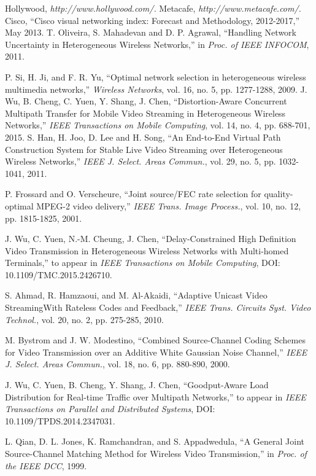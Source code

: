 \documentclass[journal]{IEEEtran}
\begin{document}
\begin{thebibliography}{1}
Hollywood, \emph{http://www.hollywood.com/.}
Metacafe, \emph{http://www.metacafe.com/.}
Cisco, ``Cisco visual networking index: Forecast and Methodology, 2012-2017,''\text{ } May 2013.
T. Oliveira, S. Mahadevan and D. P. Agrawal, ``Handling Network Uncertainty in Heterogeneous Wireless Networks,'' in \emph{Proc. of IEEE INFOCOM}, 2011.

P. Si, H. Ji, and F. R. Yu, ``Optimal network selection in heterogeneous wireless multimedia networks,''\emph{ Wireless Networks}, vol. 16, no. 5, pp. 1277-1288, 2009.
J. Wu, B. Cheng, C. Yuen, Y. Shang, J. Chen, ``Distortion-Aware Concurrent Multipath Transfer for Mobile Video Streaming in Heterogeneous Wireless Networks,'' \emph{IEEE Transactions on Mobile Computing}, vol. 14, no. 4, pp. 688-701, 2015.
S. Han, H. Joo, D. Lee and H. Song, ``An End-to-End Virtual Path Construction System for Stable Live Video Streaming over Heterogeneous Wireless Networks,'' \emph{ IEEE J. Select. Areas Commun.}, vol. 29, no. 5, pp. 1032-1041, 2011.

P. Frossard and O. Verscheure, ``Joint source/FEC rate selection for quality-optimal MPEG-2 video delivery,'' \emph{IEEE Trans. Image Process.}, vol. 10, no. 12, pp. 1815-1825, 2001.

J. Wu, C. Yuen, N.-M. Cheung, J. Chen, ``Delay-Constrained High Definition Video Transmission in Heterogeneous Wireless Networks with Multi-homed Terminals,'' to appear in \emph{IEEE Transactions on Mobile Computing}, DOI: 10.1109/TMC.2015.2426710.

S. Ahmad, R. Hamzaoui, and M. Al-Akaidi, ``Adaptive Unicast Video StreamingWith Rateless Codes and Feedback,'' \emph{IEEE Trans. Circuits Syst. Video Technol.}, vol. 20, no. 2, pp. 275-285, 2010.

M. Bystrom and J. W. Modestino, ``Combined Source-Channel Coding Schemes for Video Transmission over an Additive White Gaussian Noise Channel,'' \emph{IEEE J. Select. Areas Commun.}, vol. 18, no. 6, pp. 880-890, 2000.

J. Wu, C. Yuen, B. Cheng, Y. Shang, J. Chen, ``Goodput-Aware Load Distribution for Real-time Traffic over Multipath Networks,'' to appear in \emph{IEEE Transactions on Parallel and Distributed Systems}, DOI: 10.1109/TPDS.2014.2347031.

L. Qian, D. L. Jones, K. Ramchandran, and S. Appadwedula, ``A General Joint Source-Channel Matching Method for Wireless Video Transmission,'' in \emph{Proc. of the IEEE DCC}, 1999.


\end{thebibliography}
\end{document}
